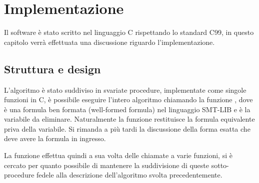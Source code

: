 \documentclass[11pt,letterpaper,twoside]{article}
\begin{document}
\newpage

\section{Implementazione} Il software \`e stato scritto nel linguaggio C
rispettando lo standard C99\autocite{c99}, in questo capitolo verrà effettuata
una discussione riguardo l'implementazione.

\subsection{Struttura e design}

\begin{center}
\end{center}

L'algoritmo \`e stato suddiviso in svariate procedure, implementate come singole
funzioni in C, è possibile eseguire l'intero algoritmo chiamando la funzione
, dove  è una formula ben
formata (well-formed formula) nel linguaggio SMT-LIB\autocite{smtlib} e
 è la variabile da eliminare.  Naturalmente la funzione restituisce
la formula equivalente priva della variabile.  Si rimanda a più tardi la
discussione della forma esatta che deve avere la formula in ingresso.

La funzione  effettua quindi a sua volta delle chiamate a varie
funzioni, si è cercato per quanto possibile di mantenere la suddivisione di
queste sotto-procedure fedele alla descrizione dell'algoritmo svolta
precedentemente.
\end{document}
